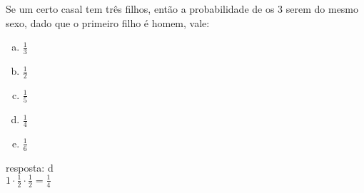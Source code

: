 \begin{ex}
 Se um certo casal tem três filhos, então a probabilidade de os 3 serem do mesmo sexo, dado que o primeiro filho é homem, vale:
    \begin{enumerate}[(a)]
        \item $\frac{1}{3}$
        \item$\frac{1}{2}$
        \item$\frac{1}{5}$
        \item$\frac{1}{4}$
        \item$\frac{1}{6}$
        \end{enumerate}
\begin{sol}
  resposta: d \\
  $1\cdot\frac{1}{2}\cdot\frac{1}{2}=\frac{1}{4}$
\end{sol}

\end{ex}